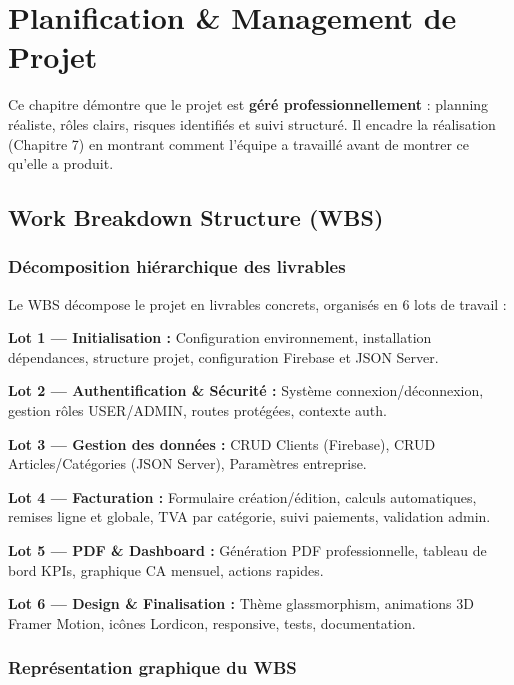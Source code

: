 \documentclass[12pt,a4paper]{report}
\begin{document}
\chapter{Planification \& Management de Projet}

Ce chapitre démontre que le projet est \textbf{géré professionnellement} : planning réaliste, rôles clairs, risques identifiés et suivi structuré. Il encadre la réalisation (Chapitre 7) en montrant comment l'équipe a travaillé avant de montrer ce qu'elle a produit.

\section{Work Breakdown Structure (WBS)}

\subsection{Décomposition hiérarchique des livrables}

Le WBS décompose le projet en livrables concrets, organisés en 6 lots de travail :

\textbf{Lot 1 — Initialisation :} Configuration environnement, installation dépendances, structure projet, configuration Firebase et JSON Server.

\textbf{Lot 2 — Authentification \& Sécurité :} Système connexion/déconnexion, gestion rôles USER/ADMIN, routes protégées, contexte auth.

\textbf{Lot 3 — Gestion des données :} CRUD Clients (Firebase), CRUD Articles/Catégories (JSON Server), Paramètres entreprise.

\textbf{Lot 4 — Facturation :} Formulaire création/édition, calculs automatiques, remises ligne et globale, TVA par catégorie, suivi paiements, validation admin.

\textbf{Lot 5 — PDF \& Dashboard :} Génération PDF professionnelle, tableau de bord KPIs, graphique CA mensuel, actions rapides.

\textbf{Lot 6 — Design \& Finalisation :} Thème glassmorphism, animations 3D Framer Motion, icônes Lordicon, responsive, tests, documentation.

\subsection{Représentation graphique du WBS}
\end{document}
